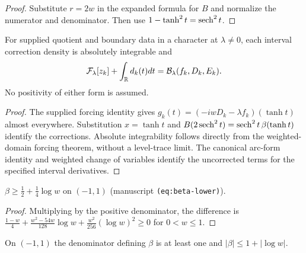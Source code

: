 \begin{proof}
\leanok
Substitute $r=2w$ in the expanded formula for $B$ and normalize the
numerator and denominator. Then use $1-\tanh^2t=\operatorname{sech}^2t$.
\end{proof}

\begin{lemma}
\label{lem:dd-boundary-form-identification}
\leanok
For supplied quotient and boundary data in a character at $\lambda\ne0$,
each interval correction density is absolutely integrable and
\[
 \mathcal F_\lambda[z_k]+\int_{\mathbb{R}} d_k(t)dt
 =\mathcal B_\lambda(f_k,D_k,E_k).
\]
No positivity of either form is assumed.
\end{lemma}

\begin{proof}
\leanok
The supplied forcing identity gives
$g_k(t)=(-iwD_k-\lambda f_k)(\tanh t)$ almost everywhere.
Substitution $x=\tanh t$ and $B(2\operatorname{sech}^2t)=\operatorname{sech}^2t\,\beta(\tanh t)$
identify the corrections. Absolute integrability follows directly from the
weighted-domain forcing theorem, without a level-trace limit.
The canonical arc-form identity and weighted change of variables identify
the uncorrected terms for the specified interval derivatives.
\end{proof}

\begin{lemma}
\label{lem:beta-lower}
\leanok
$\beta\ge\tfrac12+\tfrac14\log w$ on $(-1,1)$ (manuscript
\texttt{(eq:beta-lower)}).
\end{lemma}

\begin{proof}
\leanok
Multiplying by the positive denominator, the difference is
$\tfrac{1-w}4+\tfrac{w^2-54w}{128}\log w+\tfrac{w^2}{256}(\log w)^2\ge0$ for
$0<w\le1$.
\end{proof}


\begin{lemma}
\label{lem:beta-log-bound}
\leanok
On $(-1,1)$ the denominator defining $\beta$ is at least one and
$|\beta|\le1+|\log w|$.
\end{lemma}

